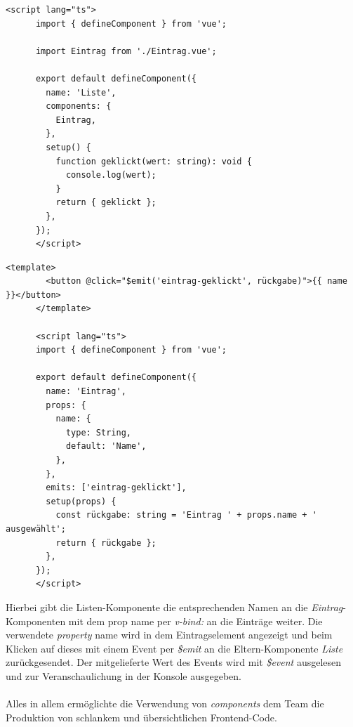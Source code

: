 \documentclass[10pt, a4paper]{article}
\begin{document}
\begin{onehalfspace}
\begin{minipage}{\textwidth}
\begin{lstlisting}[caption={beispielhafte Listen-Komponente (Liste.vue)}, captionpos=b, label=lst:Liste]
      <script lang="ts">
      import { defineComponent } from 'vue';

      import Eintrag from './Eintrag.vue';

      export default defineComponent({
        name: 'Liste',
        components: {
          Eintrag,
        },
        setup() {
          function geklickt(wert: string): void {
            console.log(wert);
          }
          return { geklickt };
        },
      });
      </script>
    \end{lstlisting}
  \end{minipage}

  \begin{minipage}{\textwidth}
    \begin{lstlisting}[caption={beispielhafte Eintrag-Komponente (Eintrag.vue)}, captionpos=b, label=lst:Eintrag]
      <template>
        <button @click="$emit('eintrag-geklickt', rückgabe)">{{ name }}</button>
      </template>

      <script lang="ts">
      import { defineComponent } from 'vue';

      export default defineComponent({
        name: 'Eintrag',
        props: {
          name: {
            type: String,
            default: 'Name',
          },
        },
        emits: ['eintrag-geklickt'],
        setup(props) {
          const rückgabe: string = 'Eintrag ' + props.name + ' ausgewählt';
          return { rückgabe };
        },
      });
      </script>
    \end{lstlisting}
  \end{minipage}

  Hierbei gibt die Listen-Komponente die entsprechenden Namen an die \textit{Eintrag}-Komponenten
  mit dem prop \glqq name\grqq{} per \textit{v-bind:} an die Einträge weiter.
  Die verwendete \textit{property} \glqq name\grqq{} wird in dem Eintragselement angezeigt und beim Klicken auf dieses mit einem Event per \textit{\$emit} an die Eltern-Komponente \textit{Liste} zurückgesendet. Der mitgelieferte Wert des Events wird mit \textit{\$event} ausgelesen und zur Veranschaulichung in der Konsole ausgegeben.
  \\~\\
  Alles in allem ermöglichte die Verwendung von \textit{components} dem Team die Produktion von schlankem und übersichtlichen Frontend-Code.


\end{onehalfspace}
\end{document}
